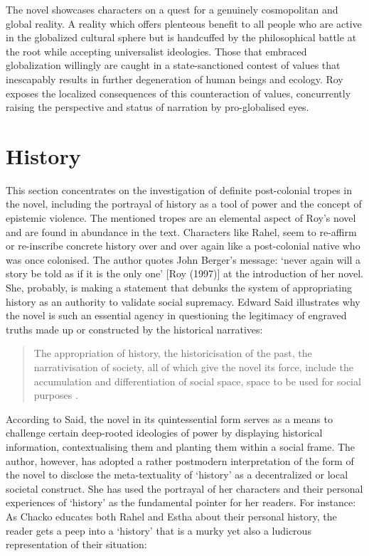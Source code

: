 The novel showcases characters on a quest for a genuinely cosmopolitan and global reality. A reality which offers plenteous benefit to all people who are active in the globalized cultural sphere but is handcuffed by the philosophical battle at the root while accepting universalist ideologies. Those that embraced globalization willingly are caught in a state-sanctioned contest of values that inescapably results in further degeneration of human beings and ecology. Roy exposes the localized consequences of this counteraction of values, concurrently raising the perspective and status of narration by pro-globalised eyes.

\section{History}

This section concentrates on the investigation of definite post-colonial tropes in the novel, including the portrayal of history as a tool of power and the concept of epistemic violence. The mentioned tropes are an elemental aspect of Roy's novel and are found in abundance in the text. Characters like Rahel, seem to re-affirm or re-inscribe concrete history over and over again like a post-colonial native who was once colonised. The author quotes John Berger's message: `never again will a story be told as if it is the only one' [Roy (1997)] at the introduction of her novel. She, probably, is making a statement that debunks the system of appropriating history as an authority to validate social supremacy. Edward Said illustrates why the novel is such an essential agency in questioning the legitimacy of engraved truths made up or constructed by the historical narratives: 

\begin{quote}
  The appropriation of history, the historicisation of the past, the narrativisation of society, all of which give the novel its force, include the accumulation and differentiation of social space, space to be used for social purposes \parencite[93]{Said1993}. 
\end{quote}

According to Said, the novel in its quintessential form serves as a means to challenge certain deep-rooted ideologies of power by displaying historical information, contextualising them and planting them within a social frame. The author, however, has adopted a rather postmodern interpretation of the form of the novel to disclose the meta-textuality of `history' as a decentralized or local societal construct. She has used the portrayal of her characters and their personal experiences of `history' as the fundamental pointer for her readers. For instance: As Chacko educates both Rahel and Estha about their personal history, the reader gets a peep into a `history' that is a murky yet also a ludicrous representation of their situation: 


